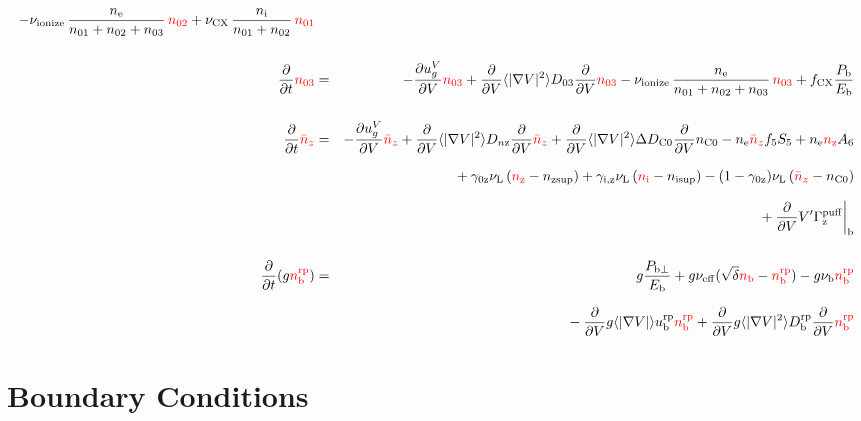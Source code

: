 \documentclass[11pt]{article}
\def\r#1{{\rm#1}}
\def\aves#1{\langle#1\rangle}
\def\dd#1#2{\frac{\partial #1}{\partial #2}}
\def\ddV{\frac{\partial}{\partial V}}
\def\ddt{\frac{\partial}{\partial t}}
\def\nee{n_\r{e}}
\def\ni{n_\r{i}}
\def\nz{n_\r{z}}
\def\nb{n_\r{b}}
\def\ugV{u_{g}^V}
\def\nsup#1{n_\r{#1sup}}
\def\nbrp{n_\r{b}^\r{rp}}
\def\ubrp{u_\r{b}^\r{rp}}
\def\Dbrp{D_\r{b}^\r{rp}}
\def\Pbperp{P_{\r{b}\perp}}
\def\Pb{P_\r{b}}
\def\Eb{E_\r{b}}
\def\nna{n_{01}}
\def\nnb{n_{02}}
\def\nnc{n_{03}}
\def\nnz{\bar{n}_{z}}
\def\nueff{\nu_\r{eff}}
\def\fCX{f_\r{CX}}
\def\nuL{\nu_\r{L}}
\def\nuCX{\nu_\r{CX}}
\def\nuion{\nu_\r{ionize}}
\def\nub{\nu_\r{b}}
\def\red#1{\textcolor{red}{#1}}
\begin{document}
\begin{eqnarray}
%
  - \nuion\, \frac{\nee}{\nna + \nnb + \nnc}\, \red{\nnb}
%
  + \nuCX\, \frac{\ni}{\nna + \nnb}\, \red{\nna}
%
\\[5mm]
  \ddt \red{\nnc} &=& 
%
  - \dd{\ugV}{V} \red{\nnc}
%
  + \ddV \aves{|\nabla V|^2} D_{03} \ddV \red{\nnc}
%
  - \nuion\, \frac{\nee}{\nna + \nnb + \nnc}\, \red{\nnc}
%
  + \fCX \frac{\Pb}{\Eb}
\\[5mm]
  \ddt \red{\nnz} &=& 
%
  - \dd{\ugV}{V} \red{\nnz}
%
  + \ddV \aves{|\nabla V|^2} D_{n\r{z}} \ddV \red{\nnz}
%
  + \ddV \aves{|\nabla V|^2} \Delta D_{\r{C0}} \ddV n_\r{C0}
%
  - \nee \red{\nnz} f_5S_5 + \nee \red{\nz} A_6 
\nonumber\\[2.5mm]&&{}
%
  + \gamma_\r{0z} \nuL \, (\red{\nz} - \nsup{z})
%
  + \gamma_\r{i,z} \nuL \, (\red{\ni} - \nsup{i})
%
  - (1-\gamma_\r{0z}) \nuL \, (\red{\nnz} - n_\r{C0})
\nonumber\\[2.5mm]&&{}
%
  + \ddV V' \Gamma^\r{puff}_\r{z}\biggr|_\r{b}
\\[5mm]
  \ddt (g \red{\nbrp}) &=&
%
    g \frac{\Pbperp}{\Eb}
%
  + g \nueff (\sqrt{\delta} \red{\nb} - \red{\nbrp})
%
  - g \nub \red{\nbrp}
%
\nonumber\\[2.5mm]&&{}
  - \ddV g \aves{|\nabla V|} \ubrp \red{\nbrp}
  + \ddV g \aves{|\nabla V|^2} \Dbrp \ddV \red{\nbrp}
\end{eqnarray}

\bigskip

\section{Boundary Conditions}
\end{document}
